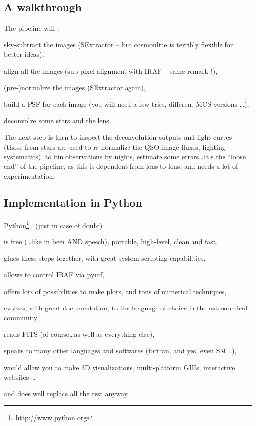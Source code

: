 \subsection{A walkthrough}

The pipeline will :
\minilist
\item sky-subtract the images (SExtractor -- but cosmouline is terribly flexible for better ideas),
\item align all the images (sub-pixel alignment with IRAF -- same remark !),
\item (pre-)normalize the images (SExtractor again),
\item build a PSF for each image (you will need a few tries, different MCS versions \ldots),
\item deconvolve some stars and the lens.
\miniend

The next step is then to inspect the deconvolution outputs and light curves (those from stars are used to re-normalize the QSO-image fluxes, fighting systematics), to bin observations by nights, estimate some errors\ldots It's the ``loose end'' of the pipeline, as this is dependent from lens to lens, and needs a lot of experimentation.

\subsection{Implementation in Python}

Python\footnote{\url{http://www.python.org}} : (just in case of doubt)
\minilist
\item is free (\ldots like in beer AND speech), portable, high-level, clean and fast,
\item glues these steps together, with great system scripting capabilities,
\item allows to control IRAF via pyraf,
\item offers lots of possibilities to make plots, and tons of numerical techniques,
\item evolves, with great documentation, to the language of choice in the astronomical community
\item reads FITS (of course\ldots as well as everything else),
\item speaks to many other languages and softwares (fortran, and yes, even SM...),
\item would allow you to make 3D visualizations, multi-platform GUIs, interactive websites \ldots
\item and does well replace all the rest anyway.
\miniend



